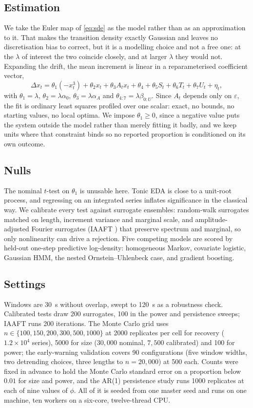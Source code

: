 \documentclass[conference]{IEEEtran}
\begin{document}
\subsection{Estimation}
We take the Euler map of \eqref{eq:sde} as the model rather than as an
approximation to it. That makes the transition density exactly Gaussian and
leaves no discretisation bias to correct, but it is a modelling choice and not
a free one: at the $\lambda$ of interest the two coincide closely, and at
larger $\lambda$ they would not. Expanding the drift, the mean increment is linear in a
reparameterised coefficient vector,
\begin{equation}
\Delta x_t=\theta_1(-x_t^3)+\theta_2 x_t+\theta_3A_tx_t+\theta_4
+\theta_5S_t+\theta_6T_t+\theta_7U_t+\eta_t ,
\label{eq:linear}
\end{equation}
with $\theta_1=\lambda$, $\theta_2=\lambda\alpha_0$, $\theta_3=\lambda\alpha_A$
and $\theta_{4:7}=\lambda\beta_{0:U}$. Since $A_t$ depends only on
$\varepsilon$, the fit is ordinary least squares profiled over one scalar:
exact, no bounds, no starting values, no local optima. We impose
$\theta_1\ge0$, since a negative value puts the system outside the model rather
than merely fitting it badly, and we keep units where that constraint binds so
no reported proportion is conditioned on its own outcome.

\subsection{Nulls}
The nominal $t$-test on $\theta_1$ is unusable here. Tonic EDA is close to a
unit-root process, and regressing on an integrated series inflates significance
in the classical way. We calibrate every test against surrogate ensembles:
random-walk surrogates matched on length, increment variance and marginal scale,
and amplitude-adjusted Fourier surrogates (IAAFT \cite{schreiber1996}) that
preserve spectrum and marginal, so only nonlinearity can drive a rejection.
Five competing models are scored by held-out one-step predictive log-density:
homogeneous Markov, covariate logistic, Gaussian HMM, the nested
Ornstein--Uhlenbeck case, and gradient boosting.

\subsection{Settings}
Windows are \SI{30}{\second} without overlap, swept to \SI{120}{\second} as a
robustness check. Calibrated tests draw 200 surrogates, 100 in the power and
persistence sweeps; IAAFT runs 200 iterations. The Monte Carlo grid uses
$n\in\{100,150,200,300,500,1000\}$ at 2000 replicates per cell for recovery
($1.2\times10^{4}$ series), 5000 for size ($30{,}000$ nominal, $7{,}500$
calibrated) and 100 for power; the early-warning validation covers 90
configurations (five window widths, two detrending choices, three lengths to
$n=20{,}000$) at 500 each. Counts were fixed in advance to hold the Monte Carlo standard error on a
proportion below $0.01$ for size and power, and the AR(1) persistence study
runs 1000 replicates at each of nine values of $\phi$. All of it is seeded from
one master seed and runs on one machine, ten workers on a six-core,
twelve-thread CPU.
\end{document}
